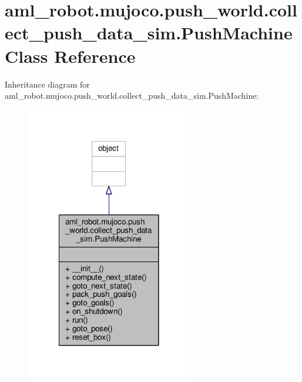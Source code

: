 \hypertarget{classaml__robot_1_1mujoco_1_1push__world_1_1collect__push__data__sim_1_1_push_machine}{\section{aml\-\_\-robot.\-mujoco.\-push\-\_\-world.\-collect\-\_\-push\-\_\-data\-\_\-sim.\-Push\-Machine Class Reference}
\label{classaml__robot_1_1mujoco_1_1push__world_1_1collect__push__data__sim_1_1_push_machine}
}


Inheritance diagram for aml\-\_\-robot.\-mujoco.\-push\-\_\-world.\-collect\-\_\-push\-\_\-data\-\_\-sim.\-Push\-Machine\-:\nopagebreak
\begin{figure}[H]
\begin{center}
\leavevmode
\includegraphics[width=206pt]{classaml__robot_1_1mujoco_1_1push__world_1_1collect__push__data__sim_1_1_push_machine__inherit__graph}
\end{center}
\end{figure}


